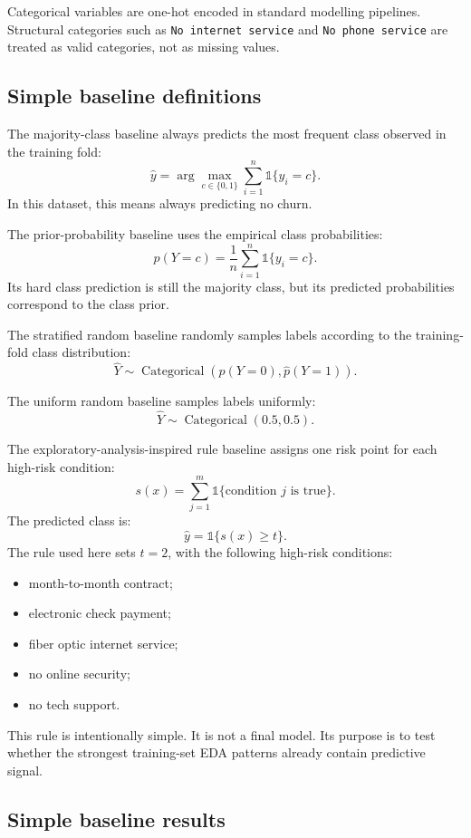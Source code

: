Categorical variables are one-hot encoded in standard modelling pipelines. Structural categories such as \texttt{No internet service} and \texttt{No phone service} are treated as valid categories, not as missing values.

\subsection{Simple baseline definitions}

The majority-class baseline always predicts the most frequent class observed in the training fold:
\[
\hat{y}
=
\arg\max_{c\in\{0,1\}}
\sum_{i=1}^{n}
\mathbb{1}\{y_i=c\}.
\]
In this dataset, this means always predicting no churn.

The prior-probability baseline uses the empirical class probabilities:
\[
\hat{p}(Y=c)
=
\frac{1}{n}
\sum_{i=1}^{n}
\mathbb{1}\{y_i=c\}.
\]
Its hard class prediction is still the majority class, but its predicted probabilities correspond to the class prior.

The stratified random baseline randomly samples labels according to the training-fold class distribution:
\[
\hat{Y}
\sim
\operatorname{Categorical}
\left(
\hat{p}(Y=0),
\hat{p}(Y=1)
\right).
\]

The uniform random baseline samples labels uniformly:
\[
\hat{Y}
\sim
\operatorname{Categorical}(0.5,0.5).
\]

The exploratory-analysis-inspired rule baseline assigns one risk point for each high-risk condition:
\[
s(x)
=
\sum_{j=1}^{m}
\mathbb{1}
\{
\text{condition }j\text{ is true}
\}.
\]
The predicted class is:
\[
\hat{y}
=
\mathbb{1}
\{
s(x)\geq t
\}.
\]
The rule used here sets \(t=2\), with the following high-risk conditions:
\begin{itemize}
    \item month-to-month contract;
    \item electronic check payment;
    \item fiber optic internet service;
    \item no online security;
    \item no tech support.
\end{itemize}
This rule is intentionally simple. It is not a final model. Its purpose is to test whether the strongest training-set EDA patterns already contain predictive signal.

\subsection{Simple baseline results}

